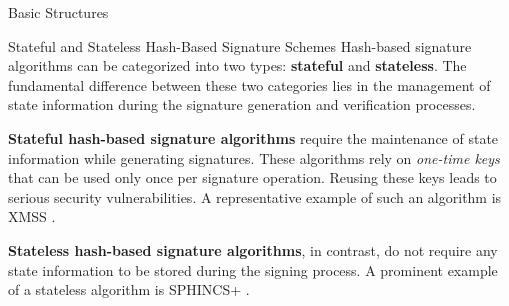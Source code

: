 \begin{section}{Basic Structures}
\begin{subsection}{Stateful and Stateless Hash-Based Signature Schemes}
	 Hash-based signature algorithms can be categorized into two types: \textbf{stateful} and \textbf{stateless}. The fundamental difference between these two categories lies in the management of state information during the signature generation and verification processes.

	 \textbf{Stateful hash-based signature algorithms} require the maintenance of state information while generating signatures. These algorithms rely on \textit{one-time keys} that can be used only once per signature operation. Reusing these keys leads to serious security vulnerabilities. A representative example of such an algorithm is XMSS \cite{huelsing2018rfc}.

	 \textbf{Stateless hash-based signature algorithms}, in contrast, do not require any state information to be stored during the signing process. A prominent example of a stateless algorithm is SPHINCS+ \cite{bernstein2019sphincs+}.

 \end{subsection}

\end{section}